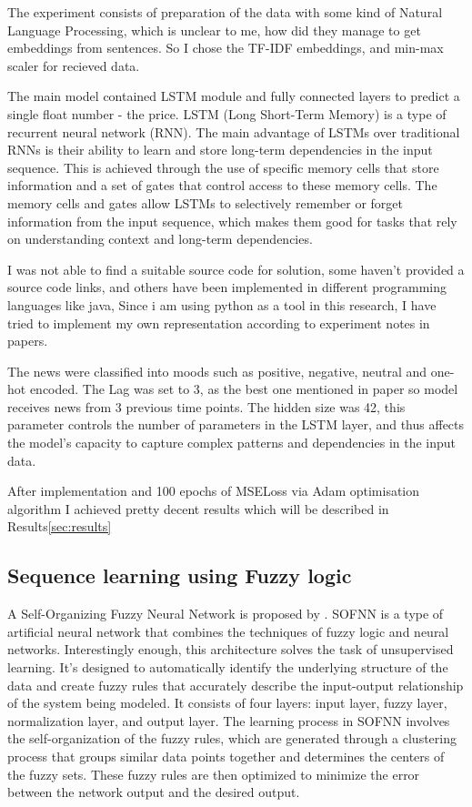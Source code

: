 \documentclass{article}
\begin{document}
The experiment consists of preparation of the data with some kind of Natural Language Processing, which is unclear to me, how did they manage to get embeddings from sentences. So I chose the TF-IDF embeddings, and min-max scaler for recieved data.

The main model contained LSTM \cite{HochSchm97} module and fully connected layers to predict a single float number - the price.
LSTM (Long Short-Term Memory) is a type of recurrent neural network (RNN). The main advantage of LSTMs over traditional RNNs is their ability to learn and store long-term dependencies in the input sequence. This is achieved through the use of specific memory cells that store information and a set of gates that control access to these memory cells. 
The memory cells and gates allow LSTMs to selectively remember or forget information from the input sequence, which makes them good for tasks that rely on understanding context and long-term dependencies.

I was not able to find a suitable source code for solution, some haven't provided a source code links, and others have been implemented in different programming languages like java, 
Since i am using python as a tool in this research, I have tried to implement my own representation according to experiment notes in papers.

The news were classified into moods such as positive, negative, neutral and one-hot encoded.
The Lag was set to 3, as the best one mentioned in paper so model receives news from 3 previous time points. The hidden size was 42, this parameter controls the number of parameters in the LSTM layer, and thus affects the model's capacity to capture complex patterns and dependencies in the input data.

After implementation and 100 epochs of MSELoss via Adam optimisation algorithm I achieved pretty decent results which will be described in Results\ref{sec:results}

\subsection{Sequence learning using Fuzzy logic}

A Self-Organizing Fuzzy Neural Network is proposed by \cite{SalimiBadr2022}.
SOFNN is a type of artificial neural network that combines the techniques of fuzzy logic and neural networks.
Interestingly enough, this architecture solves the task of unsupervised learning.
It's designed to automatically identify the underlying structure of the data and create fuzzy rules that accurately describe the input-output relationship of the system being modeled. It consists of four layers: input layer, fuzzy layer, normalization layer, and output layer.
The learning process in SOFNN involves the self-organization of the fuzzy rules, which are generated through a clustering process that groups similar data points together and determines the centers of the fuzzy sets. 
These fuzzy rules are then optimized to minimize the error between the network output and the desired output.
\end{document}
